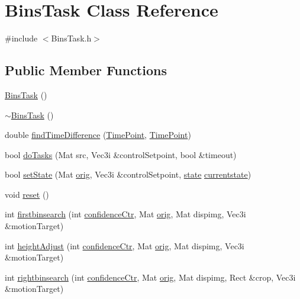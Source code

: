 \hypertarget{classBinsTask}{}\section{Bins\+Task Class Reference}
\label{classBinsTask}


{\ttfamily \#include $<$Bins\+Task.\+h$>$}

\subsection*{Public Member Functions}
\begin{DoxyCompactItemize}
\item 
\hyperlink{classBinsTask_ae281a44a4350b89efee5c1b43fba81ea}{Bins\+Task} ()
\item 
\hyperlink{classBinsTask_a2c2428c70f54f1ca73e107afeb5f9c3b}{$\sim$\+Bins\+Task} ()
\item 
double \hyperlink{classBinsTask_a11bae31515c6203ee470e5000a481fb2}{find\+Time\+Difference} (\hyperlink{thruster__driver_8cpp_ad3e807c387dc076de974ff7eac67ad81}{Time\+Point}, \hyperlink{thruster__driver_8cpp_ad3e807c387dc076de974ff7eac67ad81}{Time\+Point})
\item 
bool \hyperlink{classBinsTask_a0a9b80db60310bbc553dcc6bb0fd7969}{do\+Tasks} (Mat src, Vec3i \&control\+Setpoint, bool \&timeout)
\item 
bool \hyperlink{classBinsTask_a7a06b66c2f28876fe5803b545d92b2af}{set\+State} (Mat \hyperlink{classBinsTask_aedf5f6032dcea5fbab09caed34cf80ac}{orig}, Vec3i \&control\+Setpoint, \hyperlink{BinsTask_8h_adc6e5733fc3c22f0a7b2914188c49c90}{state} \hyperlink{classBinsTask_a582b4e240c7018b7119f20c66860a6cf}{currentstate})
\item 
void \hyperlink{classBinsTask_a83fc283bddeb24b6bc4772e372d6ff2f}{reset} ()
\item 
int \hyperlink{classBinsTask_a26bee7a25e6dd7ae137caaf6e386b981}{firstbinsearch} (int \hyperlink{BinsTask_8cpp_ac559c47f5c7d297de44ad8e157f30eec}{confidence\+Ctr}, Mat \hyperlink{classBinsTask_aedf5f6032dcea5fbab09caed34cf80ac}{orig}, Mat dispimg, Vec3i \&motion\+Target)
\item 
int \hyperlink{classBinsTask_a83227b34e66b476dcac18ef8be3912a0}{height\+Adjust} (int \hyperlink{BinsTask_8cpp_ac559c47f5c7d297de44ad8e157f30eec}{confidence\+Ctr}, Mat \hyperlink{classBinsTask_aedf5f6032dcea5fbab09caed34cf80ac}{orig}, Mat dispimg, Vec3i \&motion\+Target)
\item 
int \hyperlink{classBinsTask_adbcab6aaf2d23d8ccd14e19a9de5c788}{rightbinsearch} (int \hyperlink{BinsTask_8cpp_ac559c47f5c7d297de44ad8e157f30eec}{confidence\+Ctr}, Mat \hyperlink{classBinsTask_aedf5f6032dcea5fbab09caed34cf80ac}{orig}, Mat dispimg, Rect \&crop, Vec3i \&motion\+Target)

\end{DoxyCompactItemize}
